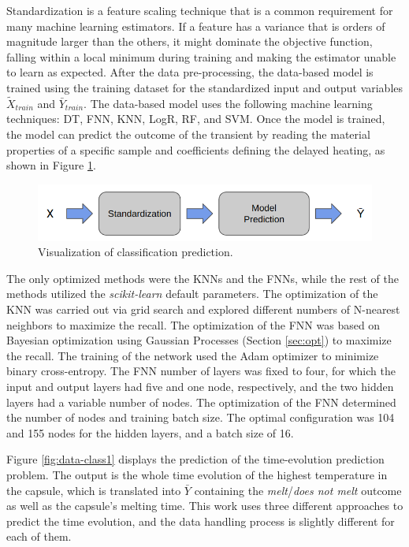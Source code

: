 Standardization is a feature scaling technique that is a common requirement for many machine learning estimators.
If a feature has a variance that is orders of magnitude larger than the others, it might dominate the objective function, falling within a local minimum during training and making the estimator unable to learn as expected.
After the data pre-processing, the data-based model is trained using the training dataset for the standardized input and output variables $\tilde{X}_{train}$ and $\bar{Y}_{train}$.
The data-based model uses the following machine learning techniques: DT, FNN, KNN, LogR, RF, and SVM.
Once the model is trained, the model can predict the outcome of the transient by reading the material properties of a specific sample and coefficients defining the delayed heating, as shown in Figure \ref{fig:data-class0}.

\begin{figure}[htbp!] %
  \centering
  \includegraphics[width=0.7\linewidth]{figures/data-prediction}
  \caption{Visualization of classification prediction.}
  \label{fig:data-class0}
\end{figure}

The only optimized methods were the KNNs and the FNNs, while the rest of the methods utilized the \textit{scikit-learn} default parameters.
The optimization of the KNN was carried out via grid search and explored different numbers of N-nearest neighbors to maximize the recall.
The optimization of the FNN was based on Bayesian optimization using Gaussian Processes (Section \ref{sec:opt}) to maximize the recall.
The training of the network used the Adam optimizer to minimize binary cross-entropy.
The FNN number of layers was fixed to four, for which the input and output layers had five and one node, respectively, and the two hidden layers had a variable number of nodes.
The optimization of the FNN determined the number of nodes and training batch size.
The optimal configuration was 104 and 155 nodes for the hidden layers, and a batch size of 16.

Figure \ref{fig:data-class1} displays the prediction of the time-evolution prediction problem.
The output is the whole time evolution of the highest temperature in the capsule, which is translated into $\bar{Y}$ containing the \textit{melt}/\textit{does not melt} outcome as well as the capsule's melting time.
This work uses three different approaches to predict the time evolution, and the data handling process is slightly different for each of them.

